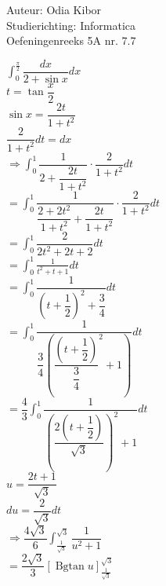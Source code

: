 \documentclass[a4paper]{article}
\begin{document}
  
\noindent \large Auteur: Odia Kibor \\
\noindent \large Studierichting: Informatica\\
\noindent \large Oefeningenreeks 5A nr. 7.7
\\

\medskip

\normalsize


$\displaystyle\int_{0}^{\tfrac{\pi}{2}} \dfrac{dx}{2 + \sin x}dx  $\\

$t = \tan \dfrac{x}{2}$\\

$\sin x = \dfrac{2t}{1 + t^2}$\\

$\dfrac{2}{1 + t^2} dt= dx$\\

$\Rightarrow \displaystyle\int_{0}^{1} \dfrac{1}{2 + \dfrac{2t}{1 + t^2}} \cdot \dfrac{2}{1 + t^2}dt$\\  

$= \displaystyle\int_{0}^{1} \dfrac{1}{\dfrac{2 + 2t^2}{1 + t^2} + \dfrac{2t}{1 + t^2}} \cdot \dfrac{2}{1 + t^2}dt$\\ 

$= \displaystyle\int_{0}^{1} \dfrac{2}{2t^2 + 2t + 2}dt$\\ 

$= \displaystyle\int_{0}^{1} \frac{1}{t^2 + t + 1 }dt$\\ 

$= \displaystyle\int_{0}^{1} \dfrac{1}{\left(t + \dfrac{1}{2}\right)^2 + \dfrac{3}{4}}dt$\\ 

$= \displaystyle\int_{0}^{1} \dfrac{1}{\dfrac{3}{4} \left(\dfrac{\left(t + \dfrac{1}{2}\right)}{\dfrac{3}{4}}^2 + 1\right)}dt$\\ 

$= \dfrac{4}{3}\displaystyle\int_{0}^{1} \dfrac{1}{\left(\dfrac{2\left(t + \dfrac{1}{2}\right)}{\sqrt{3}}\right)^2 + 1}dt$\\ 

$u = \dfrac{2t + 1}{\sqrt{3}}$\\

$du = \dfrac{2}{\sqrt{3}} dt$\\

$\Rightarrow \dfrac{4\sqrt{3}}{6} \displaystyle\int_{\tfrac{1}{\sqrt{3}}}^{\sqrt{3}} \dfrac{1}{u^2 + 1}$\\

$= \dfrac{2\sqrt{3}}{3} \left[\operatorname{Bgtan} u\right]_{\tfrac{1}{\sqrt{3}}}^{\sqrt{3}} $\\
\end{document}
